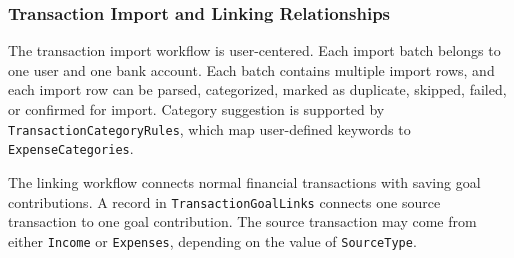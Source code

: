 \documentclass{article}
\begin{document}
\subsubsection{Transaction Import and Linking Relationships}

The transaction import workflow is user-centered. Each import batch belongs to one user and one
bank account. Each batch contains multiple import rows, and each import row can be parsed,
categorized, marked as duplicate, skipped, failed, or confirmed for import. Category suggestion
is supported by \texttt{TransactionCategoryRules}, which map user-defined keywords to
\texttt{ExpenseCategories}.

The linking workflow connects normal financial transactions with saving goal contributions. A
record in \texttt{TransactionGoalLinks} connects one source transaction to one goal contribution.
The source transaction may come from either \texttt{Income} or \texttt{Expenses}, depending on the
value of \texttt{SourceType}.
\end{document}

